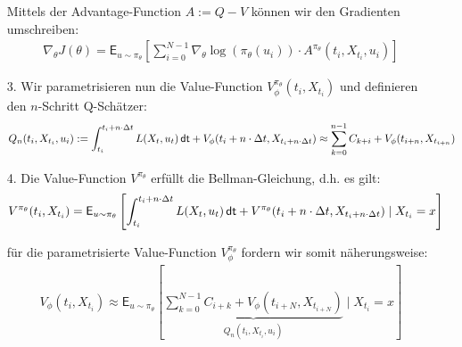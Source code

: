 \documentclass[a4paper, 12pt]{scrartcl}
\newcommand{\dt}{\thinspace \mathsf{dt}}
\begin{document}
\begin{beweis}
\begin{itemize}
        Mittels der Advantage-Function $A := Q-V$ können wir den Gradienten umschreiben:
        \begin{align*}
            \nabla_{\theta} J(\theta)
            =
            \mathsf{E}_{u \sim \pi_{\theta}}
            \left[
                \sum_{i=0}^{N-1}
                \nabla_{\theta} \log(\pi_{\theta}(u_i))
                \cdot
                A^{\pi_{\theta}}(t_i,X_{t_i}, u_i)
            \right]
        \end{align*}

        \item[3.] Wir parametrisieren nun die Value-Function 
        $V_{\phi}^{\pi_{\theta}}(t_i,X_{t_i})$ und 
        definieren den $n$-Schritt Q-Schätzer:
        \begin{align*}
            Q_n(t_i , X_{t_i}, u_i) 
            := 
            \int_{t_i}^{t_i + n \cdot \Delta t} L(X_t,u_t) \dt 
            + 
            V_{\phi}(t_i + n \cdot \Delta t, X_{t_i + n \cdot \Delta t})
            \approx
            \sum_{k=0}^{n-1}
            C_{k+i}
            +
            V_{\phi}(t_{i+n}, X_{t_{i+n}})
        \end{align*}

        \item[4.] Die Value-Function $V^{\pi_{\theta}}$ erfüllt die Bellman-Gleichung, 
        d.h. es gilt:
        \begin{align*}
            V^{\pi_{\theta}} (t_i , X_{t_i}) 
            &=
            \mathsf{E}_{u \sim \pi_{\theta}}
            \left[  
                \int_{t_i}^{t_i + n \cdot \Delta t} L(X_t,u_t) \dt
                +
                V^{\pi_{\theta}}(t_i + n \cdot \Delta t, X_{t_i + n \cdot \Delta t})
                \mid
                X_{t_i}= x
            \right]
        \end{align*}

        für die parametrisierte Value-Function $V_{\phi}^{\pi_{\theta}}$
        fordern wir somit näherungsweise:
        \begin{align*}
            V_{\phi}(t_i , X_{t_i})
            \approx
            \mathsf{E}_{u \sim \pi_{\theta}}
            \left[
                \underbrace{
                    \sum_{k=0}^{N-1} C_{i+k}
                    + 
                    V_{\phi}(t_{i+N}, X_{t_{i+N}})
                }_{
                    Q_n(t_i , X_{t_i}, u_i)
                }
                \mid
                X_{t_i}= x
            \right] 
        \end{align*}


\end{itemize}
\end{beweis}
\end{document}
